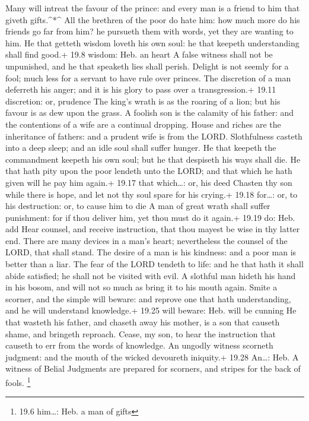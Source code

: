  Many will intreat the favour of the prince: and every man
is a friend to him that giveth gifts.\^{}*\^{}  All the
brethren of the poor do hate him: how much more do his friends go far
from him? he pursueth them with words, yet they are wanting to him.
 He that getteth wisdom loveth his own soul: he that keepeth
understanding shall find good.+ 19.8 wisdom: Heb. an heart 
A false witness shall not be unpunished, and he that speaketh lies shall
perish.  Delight is not seemly for a fool; much less for a
servant to have rule over princes.  The discretion of a man
deferreth his anger; and it is his glory to pass over a transgression.+
19.11 discretion: or, prudence  The king's wrath is as the
roaring of a lion; but his favour is as dew upon the grass.
 A foolish son is the calamity of his father: and the
contentions of a wife are a continual dropping.  House and
riches are the inheritance of fathers: and a prudent wife is from the
LORD.  Slothfulness casteth into a deep sleep; and an idle
soul shall suffer hunger.  He that keepeth the commandment
keepeth his own soul; but he that despiseth his ways shall die.
 He that hath pity upon the poor lendeth unto the LORD; and
that which he hath given will he pay him again.+ 19.17 that which\ldots:
or, his deed  Chasten thy son while there is hope, and let
not thy soul spare for his crying.+ 19.18 for\ldots: or, to his
destruction: or, to cause him to die  A man of great wrath
shall suffer punishment: for if thou deliver him, yet thou must do it
again.+ 19.19 do: Heb. add  Hear counsel, and receive
instruction, that thou mayest be wise in thy latter end. 
There are many devices in a man's heart; nevertheless the counsel of the
LORD, that shall stand.  The desire of a man is his
kindness: and a poor man is better than a liar.  The fear
of the LORD tendeth to life: and he that hath it shall abide satisfied;
he shall not be visited with evil.  A slothful man hideth
his hand in his bosom, and will not so much as bring it to his mouth
again.  Smite a scorner, and the simple will beware: and
reprove one that hath understanding, and he will understand knowledge.+
19.25 will beware: Heb. will be cunning  He that wasteth
his father, and chaseth away his mother, is a son that causeth shame,
and bringeth reproach.  Cease, my son, to hear the
instruction that causeth to err from the words of knowledge.
 An ungodly witness scorneth judgment: and the mouth of the
wicked devoureth iniquity.+ 19.28 An\ldots: Heb. A witness of Belial
 Judgments are prepared for scorners, and stripes for the
back of fools. \footnote{19.6 him\ldots: Heb. a man of gifts}

